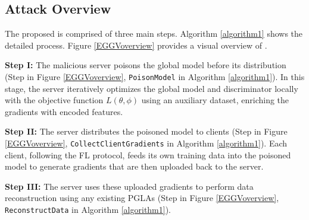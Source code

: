 \subsection{Attack Overview}
The proposed \name is comprised of three main steps. Algorithm \ref{algorithm1} shows the detailed process. Figure \ref{EGGVoverview}  provides a visual overview of \name.

\textbf{Step I:} The malicious server poisons the global model before its distribution (Step  in Figure \ref{EGGVoverview}, \texttt{PoisonModel} in Algorithm \ref{algorithm1}). In this stage, the server iteratively optimizes the global model and discriminator locally with the objective function $L(\theta, \phi)$ using an auxiliary dataset, enriching the gradients with encoded features.

\textbf{Step II:} The server distributes the poisoned model to clients (Step  in Figure \ref{EGGVoverview}, \texttt{CollectClientGradients} in Algorithm \ref{algorithm1}). Each client, following the FL protocol, feeds its own training data into the poisoned model to generate gradients that are then uploaded back to the server.

\textbf{Step III:} The server uses these uploaded gradients to perform data reconstruction using any existing PGLAs (Step  in Figure \ref{EGGVoverview}, \texttt{ReconstructData} in Algorithm \ref{algorithm1}).

